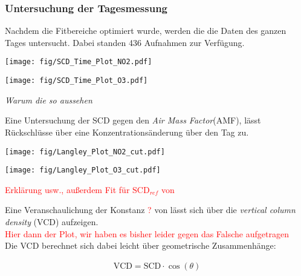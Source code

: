 \documentclass[12pt, a4paper, bibliography=totoc]{scrartcl}
\begin{document}
\begin{multicols}{2}
\subsubsection{Untersuchung der Tagesmessung}

Nachdem die Fitbereiche optimiert wurde, werden die die Daten des ganzen Tages untersucht. Dabei standen 436 Aufnahmen zur Verfügung.

\begin{center}
	\texttt{[image: fig/SCD\_Time\_Plot\_NO2.pdf]}
	\label{fig:delta_SCD_time_NO2}
\end{center}
       
\begin{center}
	\texttt{[image: fig/SCD\_Time\_Plot\_O3.pdf]}
	\label{fig:Delta_SCD_time_O3}
\end{center}       

\textit{Warum die so aussehen}

Eine Untersuchung der SCD gegen den \textit{Air Mass Factor}(AMF), lässt Rückschlüsse über eine Konzentrationsänderung über den Tag zu.

\begin{center}
	\texttt{[image: fig/Langley\_Plot\_NO2\_cut.pdf]}
	\label{fig:langley_NO2}
\end{center}

\begin{center}
	\texttt{[image: fig/Langley\_Plot\_O3\_cut.pdf]}
	\label{fig:langley_O3}
\end{center}

\textcolor{red}{Erklärung usw., außerdem Fit für $\text{SCD}_{ref}$ von }

Eine Veranschaulichung der Konstanz \textcolor{red}{?} von   lässt sich über die \textit{vertical column density} (VCD) aufzeigen.
\\
\textcolor{red}{Hier dann der Plot, wir haben es bisher leider gegen das Falsche aufgetragen}
\\
Die VCD berechnet sich dabei leicht über geometrische Zusammenhänge: 

\begin{align}
    \text{VCD} = \text{SCD} \cdot \cos(\theta)
\end{align}


\end{multicols}
\end{document}
